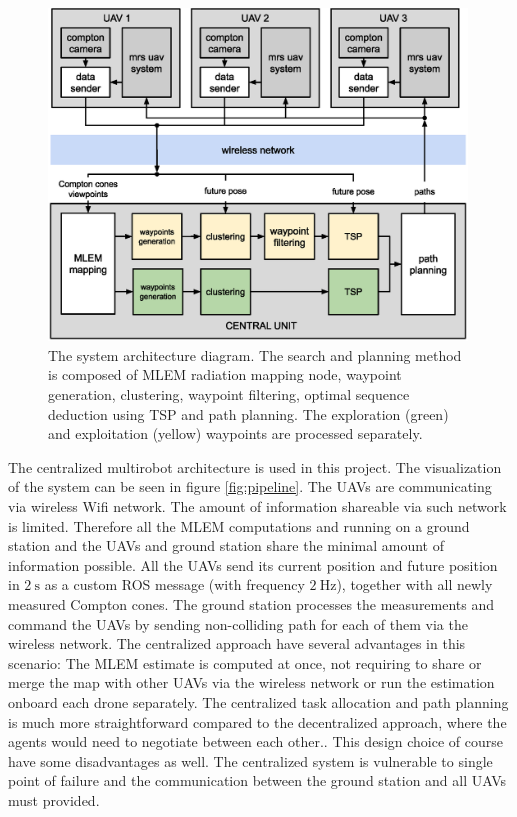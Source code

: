 \begin{figure}[!htb]
    \centering
    \includegraphics[width=0.99\textwidth]{./fig/photos/system_new.eps}
    \caption{\centering The system architecture diagram. The search and planning method is composed of \ac{MLEM} radiation mapping node, waypoint generation, clustering, waypoint filtering, optimal sequence deduction using TSP and path planning. The exploration (green) and exploitation (yellow) waypoints are processed separately.}
    \label{fig:sysarch}
\end{figure}

The centralized multirobot architecture is used in this project.
The visualization of the system can be seen in figure \ref{fig:pipeline}.
The \ac{UAV}s are communicating via wireless \ac{Wifi} network.
The amount of information shareable via such network is limited.
Therefore all the \ac{MLEM} computations and running on a ground station and the \ac{UAV}s and ground station share the minimal amount of information possible.
All the \ac{UAV}s send its current position and future position in $\SI{2}\second$ as a custom \ac{ROS} message (with frequency $\SI{2}\hertz$), 
together with all newly measured Compton cones.
The ground station processes the measurements and command the \ac{UAV}s by sending non-colliding path for each of them via the wireless network.
The centralized approach have several advantages in this scenario:
The \ac{MLEM} estimate is computed at once, not requiring to share or merge the map with other \ac{UAV}s via the wireless network or run the estimation onboard each drone separately.
The centralized task allocation and path planning is much more straightforward compared to the decentralized approach, where the agents would need to negotiate between each other..
This design choice of course have some disadvantages as well.
The centralized system is vulnerable to single point of failure and the communication between the ground station and all \ac{UAV}s must provided. 

